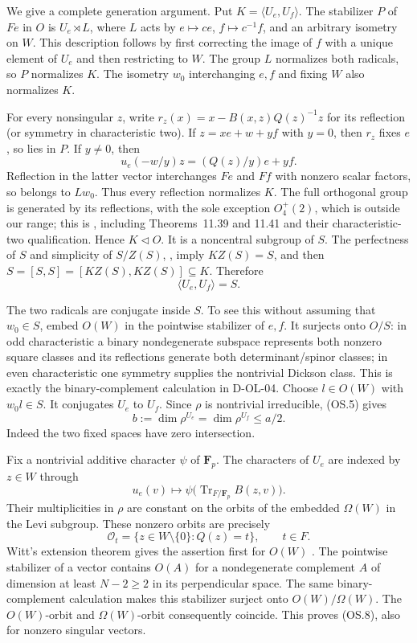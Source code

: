 We give a complete generation argument.  Put $K=\langle U_e,U_f\rangle$.
The stabilizer $P$ of $Fe$ in $O$ is $U_e\rtimes L$, where $L$ acts
by $e\mapsto ce$, $f\mapsto c^{-1}f$, and an arbitrary isometry on
$W$.  This description follows by first correcting the image of $f$
with a unique element of $U_e$ and then restricting to $W$.
The group $L$ normalizes both radicals, so $P$ normalizes $K$.
The isometry $w_0$ interchanging $e,f$ and fixing $W$ also normalizes
$K$.

For every nonsingular $z$, write
$r_z(x)=x-B(x,z)Q(z)^{-1}z$ for its reflection (or symmetry in
characteristic two).  If $z=xe+w+yf$ with $y=0$, then $r_z$ fixes
$e$, so lies in $P$.  If $y\ne0$, then
\[
 u_e(-w/y)z=(Q(z)/y)e+yf.
 \tag{OS.4}
\]
Reflection in the latter vector interchanges $Fe$ and $Ff$ with
nonzero scalar factors, so belongs to $Lw_0$.  Thus every reflection
normalizes $K$.  The full orthogonal group is generated by its
reflections, with the sole exception $O_4^+(2)$, which is outside
our range; this is \cite[Corollary~11.42, p.~159]{OS:Taylor1992},
including Theorems~11.39 and 11.41 and their characteristic-two
qualification.  Hence $K\triangleleft O$.  It is a noncentral
subgroup of $S$.  The perfectness of $S$ and simplicity of $S/Z(S)$,
\cite[Theorems~11.47--11.48, pp.~161--162]{OS:Taylor1992}, imply
$KZ(S)=S$, and then
$S=[S,S]=[KZ(S),KZ(S)]\subseteq K$.  Therefore
\[
                         \langle U_e,U_f\rangle=S.
 \tag{OS.5}
\]

The two radicals are conjugate inside $S$.  To see this without
assuming that $w_0\in S$, embed $O(W)$ in the pointwise stabilizer
of $e,f$.  It surjects onto $O/S$: in odd characteristic a binary
nondegenerate subspace represents both nonzero square classes and
its reflections generate both determinant/spinor classes; in even
characteristic one symmetry supplies the nontrivial Dickson class.
This is exactly the binary-complement calculation in D-OL-04.
Choose $l\in O(W)$ with $w_0l\in S$.  It conjugates $U_e$ to $U_f$.
Since $\rho$ is nontrivial irreducible, (OS.5) gives
\[
 b:=\dim \rho^{U_e}=\dim\rho^{U_f}\le a/2.
 \tag{OS.6}
\]
Indeed the two fixed spaces have zero intersection.

Fix a nontrivial additive character $\psi$ of $\mathbf F_p$.
The characters of $U_e$ are indexed by $z\in W$ through
\[
 u_e(v)\longmapsto
 \psi\bigl(\operatorname{Tr}_{F/\mathbf F_p} B(z,v)\bigr).
 \tag{OS.7}
\]
Their multiplicities in $\rho$ are constant on the orbits of the
embedded $\Omega(W)$ in the Levi subgroup.  These nonzero orbits
are precisely
\[
                  \mathcal O_t=\{z\in W\setminus\{0\}:Q(z)=t\},
                  \qquad t\in F.
 \tag{OS.8}
\]
Witt's extension theorem gives the assertion first for $O(W)$
\cite[Theorem~7.4, pp.~57--58]{OS:Taylor1992}.  The pointwise
stabilizer of a vector contains $O(A)$ for a nondegenerate
complement $A$ of dimension at least $N-2\ge2$ in its perpendicular
space.  The same binary-complement calculation makes this
stabilizer surject onto $O(W)/\Omega(W)$.  The $O(W)$-orbit and
$\Omega(W)$-orbit consequently coincide.  This proves (OS.8),
also for nonzero singular vectors.

